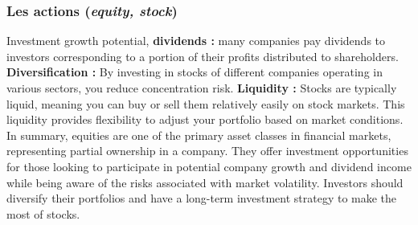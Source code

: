 \documentclass[a4paper]{article}
\begin{document}
\subsubsection{Les actions (\textit{equity, stock})}

Investment growth potential, \textbf{dividends :} many companies pay dividends to investors corresponding to a portion of their profits distributed to shareholders. \textbf{Diversification :}  By investing in stocks of different companies operating in various sectors, you reduce concentration risk. \textbf{Liquidity :}  Stocks are typically liquid, meaning you can buy or sell them relatively easily on stock markets. This liquidity provides flexibility to adjust your portfolio based on market conditions.\\
In summary, equities are one of the primary asset classes in financial markets, representing partial ownership in a company. They offer investment opportunities for those looking to participate in potential company growth and dividend income while being aware of the risks associated with market volatility. Investors should diversify their portfolios and have a long-term investment strategy to make the most of stocks.
\end{document}

